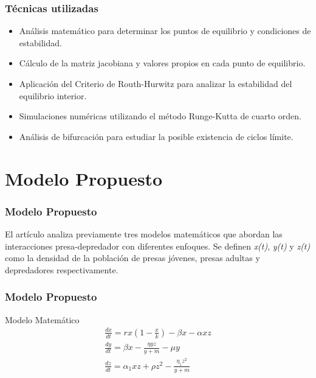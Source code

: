 \documentclass{beamer}
\begin{document}
\begin{frame}
	\frametitle{T\'ecnicas utilizadas}
	\begin{minipage}{10cm}
		\begin{itemize}
			\item Análisis matemático para determinar los puntos de equilibrio y condiciones de estabilidad.
			\item Cálculo de la matriz jacobiana y valores propios en cada punto de equilibrio.
			\item Aplicación del Criterio de Routh-Hurwitz
			      para analizar la estabilidad del equilibrio interior.
			\item Simulaciones numéricas utilizando el método Runge-Kutta de
			      cuarto orden.
			\item Análisis de bifurcación para estudiar la posible existencia de ciclos límite.
		\end{itemize}
	\end{minipage}
\end{frame}

\section{Modelo Propuesto}
\begin{frame}
	\frametitle{Modelo Propuesto}
	\begin{minipage}{10cm}
		El artículo analiza previamente tres modelos matemáticos que abordan las interacciones presa-depredador con diferentes enfoques.
		Se definen \emph{x(t)}, \emph{y(t)} y \emph{z(t)} como la densidad de la poblaci\'on de presas j\'ovenes, presas adultas y depredadores respectivamente.

	\end{minipage}
\end{frame}

\begin{frame}
	\frametitle{Modelo Propuesto}
	\begin{minipage}{10cm}
		\begin{block}{Modelo Matem\'atico}
			\begin{equation} \label{twoPreyonePredatorEDO}
				\begin{gathered}
					\frac{d x}{d t}=r x\left(1-\frac{x}{k}\right)-\beta x-\alpha x z \\
					\frac{d y}{d t}=\beta x-\frac{\eta y z}{y+m}-\mu y \\
					\frac{d z}{d t}=\alpha_1 x z + \rho z^2-\frac{\eta_1 z^2}{y+m}
				\end{gathered}
			\end{equation}
		\end{block}

	\end{minipage}
\end{frame}
\end{document}
